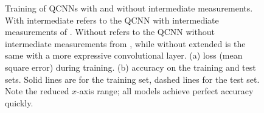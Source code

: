 \begin{figure}
\begin{subfigure}{0.49\textwidth}
        \caption{}
        \label{fig:qcnnm_acc}
    \end{subfigure}
    \caption{
        Training of QCNNs with and without intermediate measurements.
        With intermediate refers to the QCNN with intermediate measurements of \cite{pesah2021}.
        Without refers to the QCNN without intermediate measurements from , while without extended is the same with a more expressive convolutional layer.
        (a) loss (mean square error) during training.
        (b) accuracy on the training and test sets.
        Solid lines are for the training set, dashed lines for the test set.
        Note the reduced $x$-axis range; all models achieve perfect accuracy quickly.
    }
    \label{fig:qcnnm_training}
\end{figure}